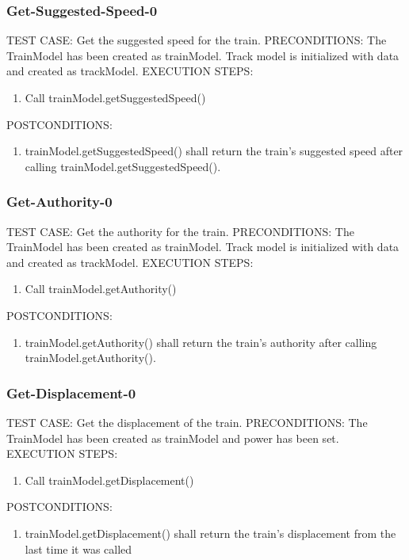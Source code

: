 \documentclass{scrreprt}
\begin{document}
\subsubsection{Get-Suggested-Speed-0}
TEST CASE: Get the suggested speed for the train.
PRECONDITIONS: The TrainModel has been created as trainModel. Track model is initialized with data and created as trackModel.
EXECUTION STEPS:
\begin{enumerate}
	\item Call trainModel.getSuggestedSpeed()
\end{enumerate}
POSTCONDITIONS:
\begin{enumerate}
	\item trainModel.getSuggestedSpeed() shall return the train's suggested speed after calling trainModel.getSuggestedSpeed().
\end{enumerate}


\subsubsection{Get-Authority-0}
TEST CASE: Get the authority for the train.
PRECONDITIONS: The TrainModel has been created as trainModel. Track model is initialized with data and created as trackModel.
EXECUTION STEPS:
\begin{enumerate}
	\item Call trainModel.getAuthority()
\end{enumerate}
POSTCONDITIONS:
\begin{enumerate}
	\item trainModel.getAuthority() shall return the train's authority after calling trainModel.getAuthority().
\end{enumerate}

\subsubsection{Get-Displacement-0}
TEST CASE: Get the displacement of the train.
PRECONDITIONS: The TrainModel has been created as trainModel and power has been set.
EXECUTION STEPS:
\begin{enumerate}
	\item Call trainModel.getDisplacement()
\end{enumerate}
POSTCONDITIONS:
\begin{enumerate}
	\item trainModel.getDisplacement() shall return the train's displacement from the last time it was called
\end{enumerate}
\end{document}
